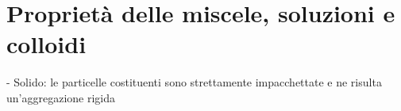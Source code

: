 \section{Proprietà delle miscele, soluzioni e colloidi}
- Solido: le particelle costituenti sono strettamente impacchettate e ne risulta un'aggregazione rigida

